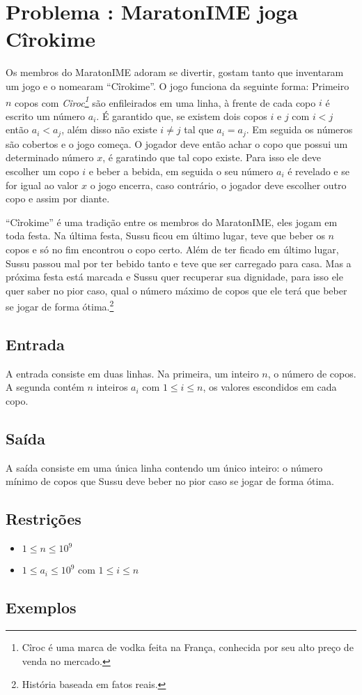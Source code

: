 \section*{Problema \proxLetra: MaratonIME joga Cîrokime}

Os membros do MaratonIME adoram se divertir, gostam tanto que inventaram um jogo e o nomearam ``Cîrokime''. O jogo funciona da seguinte forma:\newline 
Primeiro $n$ copos com \textit{Cîroc\footnote{Cîroc é uma marca de vodka feita na França, conhecida por seu alto preço de venda no mercado.}} são enfileirados em uma linha, à frente de cada copo $i$ é escrito um número $a_i$. É garantido que, se existem dois copos $i$ e $j$ com $i < j$ então $a_i < a_j$, além disso não existe $i \neq j$ tal que $a_i = a_j$. Em seguida os números são cobertos e o jogo começa.
O jogador deve então achar o copo que possui um determinado número $x$, é garatindo que tal copo existe. Para isso ele deve escolher um copo $i$ e beber a bebida, em seguida o seu número $a_i$ é revelado e se for igual ao valor $x$ o jogo encerra, caso contrário, o jogador deve escolher outro copo e assim por diante. 

``Cîrokime'' é uma tradição entre os membros do MaratonIME, eles jogam em toda festa. Na última festa, Sussu ficou em último lugar, teve que beber os $n$ copos e só no fim encontrou o copo certo. Além de ter ficado em último lugar, Sussu passou mal por ter bebido tanto e teve que ser carregado para casa. Mas a próxima festa está marcada e Sussu quer recuperar sua dignidade, para isso ele quer saber no pior caso, qual o número máximo de copos que ele terá que beber se jogar de forma ótima.\footnote{História baseada em fatos reais.}

\subsection*{Entrada}
\textoDiversasInstanciasEOF

A entrada consiste em duas linhas. Na primeira, um inteiro $n$, o número de copos. A segunda contém $n$ inteiros $a_i$ com $1 \leq i \leq n$, os valores escondidos em cada copo.


\subsection*{Saída}

A saída consiste em uma única linha contendo um único inteiro: o número mínimo de copos que Sussu deve beber no pior caso se jogar de forma ótima.


\subsection*{Restrições}
\begin{itemize}
  \item $1 \leq n \leq 10^9$
  \item $1 \leq a_i \leq 10^9$ com $1 \leq i \leq n$
\end{itemize}

\subsection*{Exemplos}


